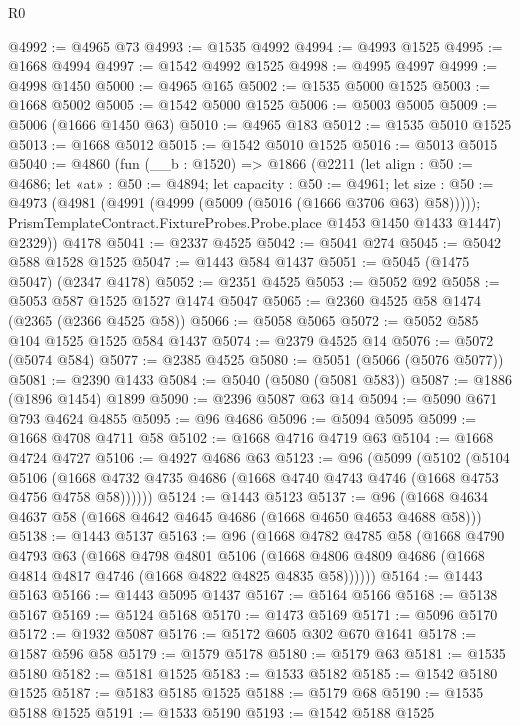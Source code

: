 \begin{lexlean}{R0}
\begin{coremodule}
@4992 := @4965 @73
@4993 := @1535 @4992
@4994 := @4993 @1525
@4995 := @1668 @4994
@4997 := @1542 @4992 @1525
@4998 := @4995 @4997
@4999 := @4998 @1450
@5000 := @4965 @165
@5002 := @1535 @5000 @1525
@5003 := @1668 @5002
@5005 := @1542 @5000 @1525
@5006 := @5003 @5005
@5009 := @5006 (@1666 @1450 @63)
@5010 := @4965 @183
@5012 := @1535 @5010 @1525
@5013 := @1668 @5012
@5015 := @1542 @5010 @1525
@5016 := @5013 @5015
@5040 := @4860
    (fun (__b : @1520) =>
    @1866
      (@2211
        (let align : @50 := @4686;
        let «at» : @50 := @4894;
        let capacity : @50 := @4961;
        let size : @50 := @4973 (@4981 (@4991 (@4999 (@5009 (@5016 (@1666 @3706 @63) @58)))));
        PrismTemplateContract.FixtureProbes.Probe.place @1453 @1450 @1433 @1447)
        @2329))
    @4178
@5041 := @2337 @4525
@5042 := @5041 @274
@5045 := @5042 @588 @1528 @1525
@5047 := @1443 @584 @1437
@5051 := @5045 (@1475 @5047) (@2347 @4178)
@5052 := @2351 @4525
@5053 := @5052 @92
@5058 := @5053 @587 @1525 @1527 @1474 @5047
@5065 := @2360 @4525 @58 @1474 (@2365 (@2366 @4525 @58))
@5066 := @5058 @5065
@5072 := @5052 @585 @104 @1525 @1525 @584 @1437
@5074 := @2379 @4525 @14
@5076 := @5072 (@5074 @584)
@5077 := @2385 @4525
@5080 := @5051 (@5066 (@5076 @5077))
@5081 := @2390 @1433
@5084 := @5040 (@5080 (@5081 @583))
@5087 := @1886 (@1896 @1454) @1899
@5090 := @2396 @5087 @63 @14
@5094 := @5090 @671 @793 @4624 @4855
@5095 := @96 @4686
@5096 := @5094 @5095
@5099 := @1668 @4708 @4711 @58
@5102 := @1668 @4716 @4719 @63
@5104 := @1668 @4724 @4727
@5106 := @4927 @4686 @63
@5123 := @96
    (@5099
      (@5102
        (@5104
          @5106
          (@1668 @4732 @4735 @4686 (@1668 @4740 @4743 @4746 (@1668 @4753 @4756 @4758 @58))))))
@5124 := @1443 @5123
@5137 := @96 (@1668 @4634 @4637 @58 (@1668 @4642 @4645 @4686 (@1668 @4650 @4653 @4688 @58)))
@5138 := @1443 @5137
@5163 := @96
    (@1668
      @4782
      @4785
      @58
      (@1668
        @4790
        @4793
        @63
        (@1668
          @4798
          @4801
          @5106
          (@1668 @4806 @4809 @4686 (@1668 @4814 @4817 @4746 (@1668 @4822 @4825 @4835 @58))))))
@5164 := @1443 @5163
@5166 := @1443 @5095 @1437
@5167 := @5164 @5166
@5168 := @5138 @5167
@5169 := @5124 @5168
@5170 := @1473 @5169
@5171 := @5096 @5170
@5172 := @1932 @5087
@5176 := @5172 @605 @302 @670 @1641
@5178 := @1587 @596 @58
@5179 := @1579 @5178
@5180 := @5179 @63
@5181 := @1535 @5180
@5182 := @5181 @1525
@5183 := @1533 @5182
@5185 := @1542 @5180 @1525
@5187 := @5183 @5185 @1525
@5188 := @5179 @68
@5190 := @1535 @5188 @1525
@5191 := @1533 @5190
@5193 := @1542 @5188 @1525

\end{coremodule}
\end{lexlean}
